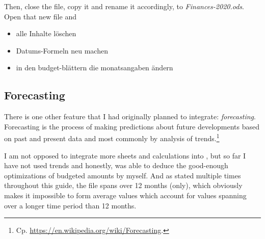 Then, close the file, copy it and rename it accordingly, \eg to \emph{Finances-2020.ods}.
Open that new file and
\begin{itemize}
	\item alle Inhalte löschen
	\item Datums-Formeln neu machen
	\item in den budget-blättern die monatsangaben ändern
\end{itemize}

\subsection{Forecasting}
\label{subsec:forecasting}

There is one other feature that I had originally planned to integrate: \emph{forecasting}.
Forecasting is the process of making predictions about future developments based on past and present data and most commonly by analysis of trends.\footnote{Cp. \href{https://en.wikipedia.org/wiki/Forecasting}{https://en.wikipedia.org/wiki/Forecasting}.}

I am not opposed to integrate more sheets and calculations into \tfn, but so far I have not used trends and honestly, was able to deduce the good-enough optimizations of budgeted amounts by myself.
And as stated multiple times throughout this guide, the file spans over 12 months (only), which obviously makes it impossible to form average values which account for values spanning over a longer time period than 12 months.